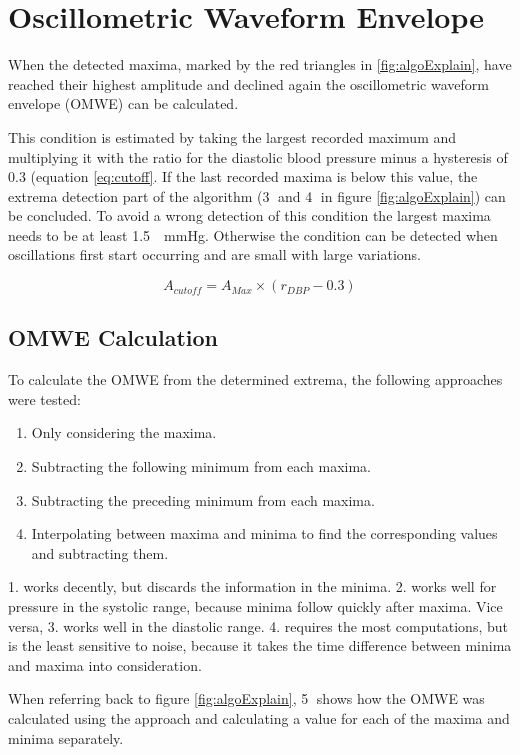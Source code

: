 \section{Oscillometric Waveform Envelope}
When the detected maxima, marked by the red triangles in \ref{fig:algoExplain}, have reached their highest amplitude and declined again the oscillometric waveform envelope (OMWE) can be calculated. 

This condition is estimated by taking the largest recorded maximum and multiplying it with the ratio for the diastolic blood pressure minus a hysteresis of $0.3$ (equation \ref{eq:cutoff}. If the last recorded maxima is below this value, the extrema detection part of the algorithm (\textcircled{3} and \textcircled{4} in figure \ref{fig:algoExplain}) can be concluded. To avoid a wrong detection of this condition the largest maxima needs to be at least \SI{1.5}{\delta\mmHg}. Otherwise the condition can be detected when oscillations first start occurring and are small with large variations. 

\begin{equation}
\label{eq:cutoff}
A_{cutoff}=A_{Max}\times (r_{DBP} - 0.3)
\end{equation}

\subsection{OMWE Calculation}
To calculate the OMWE from the determined extrema, the following approaches were tested:

\begin{enumerate}[noitemsep]
\item Only considering the maxima.
\item Subtracting the following minimum from each maxima.
\item Subtracting the preceding minimum from each maxima.
\item Interpolating between maxima and minima to find the corresponding values and subtracting them. 
\end{enumerate}

1. works decently, but discards the information in the minima. 2. works well for pressure in the systolic range, because minima follow quickly after maxima. Vice versa, 3. works well in the diastolic range. 4. requires the most computations, but is the least sensitive to noise, because it takes the time difference between minima and maxima into consideration. 

When referring back to figure \ref{fig:algoExplain}, \textcircled{5} shows how the OMWE was calculated using the approach and calculating a value for each of the maxima and minima separately. 


